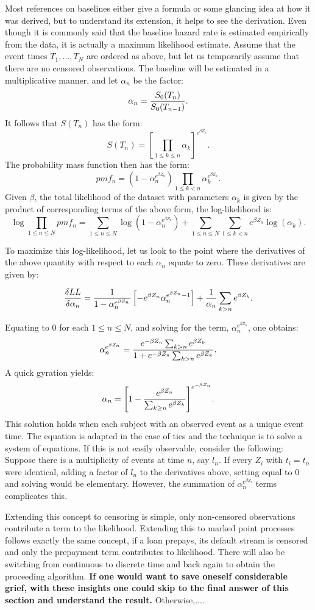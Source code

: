 \documentclass[10pt]{article}
\begin{document}
Most references on baselines either give a formula or some glancing idea at how it was derived, but to understand its extension, it helps to see the 
derivation. Even though it is commonly said that the baseline hazard rate is estimated empirically from the data, it is actually 
a maximum likelihood estimate.
Assume that the event times $T_1, \ldots, T_N$ are ordered as above, 
but let us temporarily assume that there are no censored observations.  The baseline will be 
estimated in a multiplicative manner, and let $\alpha_n$ be the factor:
	$$\alpha_n={S_0(T_n)\over S_0(T_{n-1})}.$$
It follows that $S(T_n)$ has the form:
	$$S(T_n)={\left[{\prod_{1 \le k \le n} \alpha_k }\right]}^{e^{\beta Z_n}}.$$
The probability mass function then has the form:
	$$pmf_n=(1-\alpha_n^{e^{\beta Z_n}})\prod_{1 \le k < n} \alpha_k^{e^{\beta Z_n}}.$$
Given $\beta$, the total likelihood of the dataset with parameters $\alpha_k$ is given by the product of corresponding terms of the above form, the log-likelihood is:
	$$\log{\prod_{1 \le n \le N} pmf_n}=\sum_{1 \le n \le N} \log(1-\alpha_n^{e^{\beta Z_n}}) +
	\sum_{1 \le n \le N}\sum_{1 \le k < n} e^{\beta Z_n}\log( \alpha_k ).$$

To maximize this log-likelihood, let us look to the point where the derivatives of the above quantity with respect to each $\alpha_n$ equate to zero.  
These derivatives are given by:

$${\delta LL \over \delta \alpha_n}= {1\over 1-\alpha_n^{e^{\beta Z_n}}}\left[{-e^{\beta Z_n}\alpha_n^{e^{\beta Z_n}-1}}\right] +{1\over \alpha_n}
\sum_{k > n} e^{\beta Z_k}.$$

Equating to 0 for each $1 \le n \le N$, and solving for the term, $\alpha_n^{e^{\beta Z_n}}$, one obtains:
$$\alpha_n^{e^{\beta Z_n}}={e^{-\beta Z_n}\sum_{k > n} e^{\beta Z_k} \over 1+ e^{-\beta Z_n}\sum_{k > n} e^{\beta Z_k}}.$$
A quick gyration yields:
$$\alpha_n={\left[{1-{e^{\beta Z_n}\over \sum_{ k \ge n} e^{\beta Z_k}}}\right]}^{e^{-\beta Z_n}}.$$
This solution holds when each subject with an observed event as a unique event time. The equation is adapted in the case of ties and the technique is to 
solve a system of equations.  If this is not easily observable, consider the following:  Suppose there is a multiplicity of events at time $n$, say $l_n$. 
If every $Z_i$ with $t_i=t_n$ were identical, adding a factor of $l_n$ to the derivatives above, setting equal to 0 and solving would be elementary.  
However, the summation of $\alpha_n^{e^{\beta Z_i}}$ terms complicates this.  

Extending this concept to censoring is simple, only non-censored observations contribute a term to the likelihood.  Extending this to marked point
processes follows exactly the same concept, if a loan prepays, its default stream is censored and only the prepayment term contributes to likelihood.
There will also be switching from continuous to discrete time and back again to obtain the proceeding algorithm.  {\bf If one would want to save 
oneself considerable grief, with these insights one could skip to the final answer of this section and understand the result.}  Otherwise,....
\end{document}
